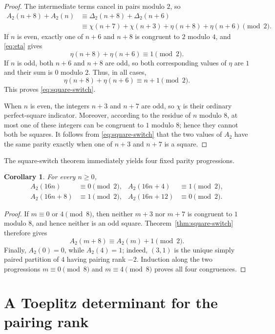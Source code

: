 \documentclass[11pt]{article}
\newtheorem{corollary}[theorem]{Corollary}
\theoremstyle{definition}
\theoremstyle{remark}
\begin{document}
\begin{proof}
The intermediate terms cancel in pairs modulo $2$, so
\begin{align*}
 A_2(n+8)+A_2(n)
 &\equiv\Delta_2(n+8)+\Delta_2(n+6)\\
 &\equiv\chi(n+7)+\chi(n+3)
   +\eta(n+8)+\eta(n+6)\pmod2.
\end{align*}
If $n$ is even, exactly one of $n+6$ and $n+8$ is congruent to $2$ modulo $4$, and \eqref{eq:eta} gives
\[
 \eta(n+8)+\eta(n+6)\equiv1\pmod2.
\]
If $n$ is odd, both $n+6$ and $n+8$ are odd, so both corresponding values of $\eta$ are $1$ and their sum is $0$ modulo $2$.  Thus, in all cases,
\[
 \eta(n+8)+\eta(n+6)\equiv n+1\pmod2.
\]
This proves \eqref{eq:square-switch}.

When $n$ is even, the integers $n+3$ and $n+7$ are odd, so $\chi$ is their ordinary perfect-square indicator.  Moreover, according to the residue of $n$ modulo $8$, at most one of these integers can be congruent to $1$ modulo $8$; hence they cannot both be squares.  It follows from \eqref{eq:square-switch} that the two values of $A_2$ have the same parity exactly when one of $n+3$ and $n+7$ is a square.
\end{proof}

The square-switch theorem immediately yields four fixed parity progressions.

\begin{corollary}\label{cor:A2-progressions}
For every $n\geq0$,
\begin{align*}
 A_2(16n)&\equiv0\pmod2,
 &A_2(16n+4)&\equiv1\pmod2,\\
 A_2(16n+8)&\equiv1\pmod2,
 &A_2(16n+12)&\equiv0\pmod2.
\end{align*}
\end{corollary}

\begin{proof}
If $m\equiv0$ or $4\pmod8$, then neither $m+3$ nor $m+7$ is congruent to $1$ modulo $8$, and hence neither is an odd square.  Theorem~\ref{thm:square-switch} therefore gives
\[
 A_2(m+8)\equiv A_2(m)+1\pmod2.
\]
Finally, $A_2(0)=0$, while $A_2(4)=1$; indeed, $(3,1)$ is the unique simply paired partition of $4$ having pairing rank $-2$.  Induction along the two progressions $m\equiv0\pmod8$ and $m\equiv4\pmod8$ proves all four congruences.
\end{proof}

\section{A Toeplitz determinant for the pairing rank}
\end{document}
